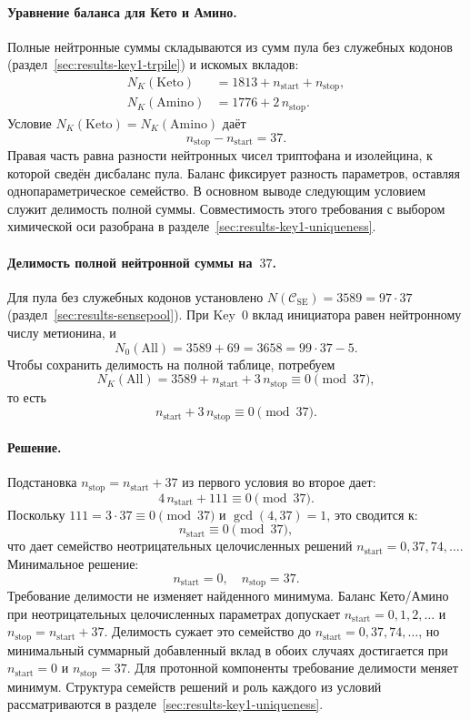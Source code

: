 \documentclass[11pt,a4paper]{article}
\renewcommand{\_}{\origunderscore\allowbreak}
\begin{document}
\paragraph{Уравнение баланса для Кето и Амино.}
Полные нейтронные суммы складываются из сумм пула
без служебных кодонов
(раздел~\ref{sec:results-key1-trpile})
и искомых вкладов:
\begin{align*}
N_K(\mathrm{Keto}) &= 1813 + n_{\text{start}} + n_{\text{stop}}, \\
N_K(\mathrm{Amino}) &= 1776 + 2\,n_{\text{stop}}.
\end{align*}
Условие $N_K(\mathrm{Keto})=N_K(\mathrm{Amino})$ даёт
\[
n_{\text{stop}}-n_{\text{start}}=37.
\]
Правая часть равна разности нейтронных чисел триптофана и
изолейцина, к которой сведён дисбаланс пула. Баланс фиксирует
разность параметров, оставляя однопараметрическое семейство.
В основном выводе следующим условием служит делимость полной суммы.
Совместимость этого требования с выбором химической оси
разобрана в разделе~\ref{sec:results-key1-uniqueness}.

\paragraph{Делимость полной нейтронной суммы на~$37$.}
Для пула без служебных кодонов установлено
$N(\mathcal{C}_{\mathrm{SE}})=3589=97\cdot37$
(раздел~\ref{sec:results-sensepool}). При Key~0 вклад
инициатора равен нейтронному числу метионина, и
\[
N_0(\mathrm{All})=3589+69=3658=99\cdot37-5.
\]
Чтобы сохранить делимость на полной таблице, потребуем
\[
N_K(\mathrm{All})=
3589+n_{\text{start}}+3\,n_{\text{stop}}
\equiv0\pmod{37},
\]
то есть
\[
n_{\text{start}}+3\,n_{\text{stop}}\equiv0\pmod{37}.
\]

\paragraph{Решение.}
Подстановка $n_{\text{stop}} = n_{\text{start}} + 37$ из первого условия во второе дает:
\[
4\, n_{\text{start}} + 111 \equiv 0 \pmod{37}.
\]
Поскольку $111 = 3 \cdot 37 \equiv 0 \pmod{37}$ и $\gcd(4, 37) = 1$, это сводится к:
\[
n_{\text{start}} \equiv 0 \pmod{37},
\]
что дает семейство неотрицательных целочисленных решений
$n_{\text{start}} = 0, 37, 74, \ldots$.
Минимальное решение:
\[
n_{\text{start}} = 0,
\quad
n_{\text{stop}} = 37.
\]
Требование делимости не изменяет найденного минимума.
Баланс Кето/Амино при неотрицательных целочисленных
параметрах допускает $n_{\text{start}} = 0, 1, 2, \ldots$
и $n_{\text{stop}} = n_{\text{start}} + 37$. Делимость
сужает это семейство до
$n_{\text{start}} = 0, 37, 74, \ldots$, но минимальный
суммарный добавленный вклад в обоих случаях достигается
при $n_{\text{start}} = 0$ и $n_{\text{stop}} = 37$.
Для протонной компоненты требование делимости меняет
минимум. Структура семейств решений и роль каждого
из условий рассматриваются в
разделе~\ref{sec:results-key1-uniqueness}.
\end{document}
